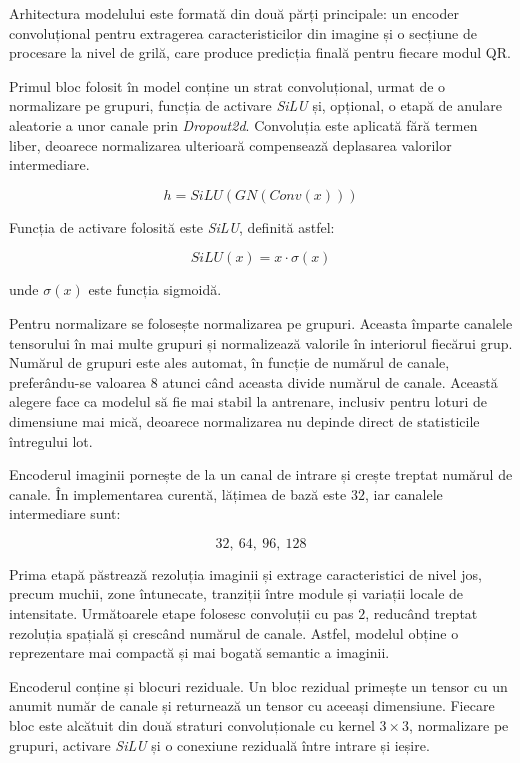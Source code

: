 Arhitectura modelului este formată din două părți principale: un encoder convoluțional pentru extragerea caracteristicilor din imagine și o secțiune de procesare la nivel de grilă, care produce predicția finală pentru fiecare modul QR.

Primul bloc folosit în model conține un strat convoluțional, urmat de o normalizare pe grupuri, funcția de activare \textit{SiLU} și, opțional, o etapă de anulare aleatorie a unor canale prin \textit{Dropout2d}. Convoluția este aplicată fără termen liber, deoarece normalizarea ulterioară compensează deplasarea valorilor intermediare.

\[
    h = SiLU(GN(Conv(x)))
\]

Funcția de activare folosită este \textit{SiLU}, definită astfel:

\[
    SiLU(x) = x \cdot \sigma(x)
\]

unde $\sigma(x)$ este funcția sigmoidă.

Pentru normalizare se folosește normalizarea pe grupuri. Aceasta împarte canalele tensorului în mai multe grupuri și normalizează valorile în interiorul fiecărui grup. Numărul de grupuri este ales automat, în funcție de numărul de canale, preferându-se valoarea $8$ atunci când aceasta divide numărul de canale. Această alegere face ca modelul să fie mai stabil la antrenare, inclusiv pentru loturi de dimensiune mai mică, deoarece normalizarea nu depinde direct de statisticile întregului lot.

Encoderul imaginii pornește de la un canal de intrare și crește treptat numărul de canale. În implementarea curentă, lățimea de bază este $32$, iar canalele intermediare sunt:

\[
32,\ 64,\ 96,\ 128
\]

Prima etapă păstrează rezoluția imaginii și extrage caracteristici de nivel jos, precum muchii, zone întunecate, tranziții între module și variații locale de intensitate. Următoarele etape folosesc convoluții cu pas $2$, reducând treptat rezoluția spațială și crescând numărul de canale. Astfel, modelul obține o reprezentare mai compactă și mai bogată semantic a imaginii.

Encoderul conține și blocuri reziduale. Un bloc rezidual primește un tensor cu un anumit număr de canale și returnează un tensor cu aceeași dimensiune. Fiecare bloc este alcătuit din două straturi convoluționale cu kernel $3 \times 3$, normalizare pe grupuri, activare \textit{SiLU} și o conexiune reziduală între intrare și ieșire.

